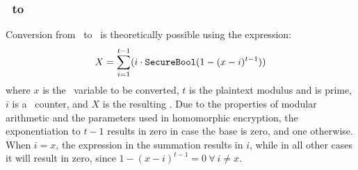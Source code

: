 \subsubsection{\secmod\ to \secuint{}}\label{sss:secmod2secuint}
\vspace{-0.2cm}
Conversion from \secmod\ to \secuint\ is theoretically possible using the expression:
\vspace{-0.2cm}
\begin{equation}\label{eq:secmod2secuint}
    \vspace{-0.1cm}
    X = \sum_{i=1}^{t-1}(i \cdot \secbool(1 - (x-i)^{t-1}))
\end{equation}
where $x$ is the \secmod\ variable to be converted, $t$ is the plaintext modulus and is prime, $i$ is a \secuint\ counter, and $X$ is the resulting \secuint. Due to the properties of modular arithmetic and the parameters used in homomorphic encryption, the exponentiation to $t-1$ results in zero in case the base is zero, and one otherwise. When $i = x$, the expression in the summation results in $i$, while in all other cases it will result in zero, since $1 - (x-i)^{t-1} = 0 \ \forall \ i \ne x$.

